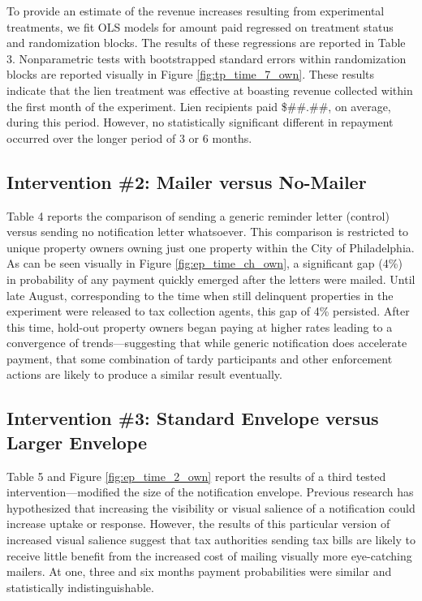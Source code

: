 \documentclass[12pt,titlepage]{article}
\begin{document}
To provide an estimate of the revenue increases resulting from experimental 
treatments, we fit OLS models for amount paid regressed on treatment status 
and randomization blocks. The results of these regressions are reported in 
Table 3. Nonparametric tests with bootstrapped standard errors within 
randomization blocks are reported visually in Figure \ref{fig:tp_time_7_own}. 
These results indicate that the lien treatment was effective at boasting 
revenue collected within the first month of the experiment. Lien recipients 
paid \$\#\#.\#\#, on average, during this period. However, no statistically 
significant different in repayment occurred over the longer period of 3 or 6 months.


\subsection{Intervention \#2: Mailer versus No-Mailer}

Table 4 reports the comparison of sending a generic reminder letter 
(control) versus sending no notification letter whatsoever. This 
comparison is restricted to unique property owners owning just one 
property within the City of Philadelphia. As can be seen visually in 
Figure \ref{fig:ep_time_ch_own}, a significant gap (4\%) in probability 
of any payment quickly emerged after the letters were mailed. Until 
late August, corresponding to the time when still delinquent properties 
in the experiment were released to tax collection agents, this gap of 
4\% persisted. After this time, hold-out property owners began paying 
at higher rates leading to a convergence of trends—suggesting that 
while generic notification does accelerate payment, that some
combination of tardy participants and other enforcement actions are 
likely to produce a similar result eventually. 

\subsection{Intervention \#3: Standard Envelope versus Larger Envelope}

Table 5 and Figure \ref{fig:ep_time_2_own} report the results of a third tested
intervention—modified the size of the notification envelope.
Previous research has hypothesized that increasing the visibility or visual 
salience of a notification could increase uptake or response.
However, the results of this particular version of increased visual salience 
suggest that tax authorities sending tax bills are likely to receive little 
benefit from the increased cost of mailing visually more eye-catching mailers. 
At one, three and six months payment probabilities were similar and 
statistically indistinguishable. 
\end{document}
